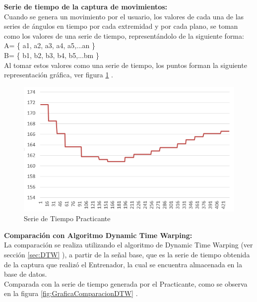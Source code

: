 \textbf{Serie de tiempo de la captura de movimientos:}\\
Cuando se genera un movimiento por el usuario, los valores de cada una de las series de ángulos en tiempo por cada extremidad y por cada plano, se toman como los valores de una serie de tiempo, representándolo de la siguiente forma:\\
A= \{ a1, a2, a3, a4, a5,...an \}\\
B= \{ b1, b2, b3, b4, b5,...bm \}\\

Al tomar estos valores como una serie de tiempo, los puntos forman la siguiente representación gráfica, ver figura \ref{fig:Grafica1_Practicante} . \\
\begin{figure}[H]%
	\begin{center}
		\includegraphics[scale=0.45]{./Figuras/Implementacion/Grafica1_Practicante}
	\end{center}
	\caption{Serie de Tiempo Practicante}
	\label{fig:Grafica1_Practicante}
\end{figure}

\textbf{Comparación con Algoritmo Dynamic Time Warping:}\\
La comparación se realiza utilizando el algoritmo de Dynamic Time Warping (ver sección \ref{sec:DTW} ), a partir de la señal base, que es la serie de tiempo obtenida de la captura que realizó el Entrenador, la cual se encuentra almacenada en la base de datos.\\
Comparada con la serie de tiempo generada por el Practicante, como se observa en la figura \ref{fig:GraficaComparacionDTW} . \\

